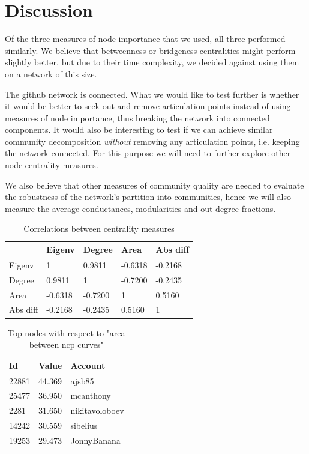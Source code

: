 \documentclass[9pt,twocolumn,twoside]{pnas-new}
\begin{document}
\pagebreak
\section*{Discussion}
Of the three measures of node importance that we used, all three performed similarly. 
We believe that betweenness or bridgeness centralities might perform slightly better, but due to their time complexity, we decided against using them on a network of this size.

The github network is connected. 
What we would like to test further is whether it would be better to seek out and remove articulation points instead of using measures of node importance, thus breaking the network into connected components.
It would also be interesting to test if we can achieve similar community decomposition \emph{without} removing any articulation points,
i.e. keeping the network connected. For this purpose we will need to further explore other node centrality measures.

We also believe that other measures of community quality are needed to evaluate the robustness of the network's partition into communities, hence we will also measure the average conductances, modularities and out-degree fractions.

\begin{table}
    \centering
    \begin{tabular}{|l|l|l|l|l|}
        \hline
        & Eigenv & Degree & Area & Abs diff \\ \hline
        Eigenv & 1 & 0.9811 & -0.6318 & -0.2168 \\ \hline
        Degree & 0.9811 & 1 & -0.7200 & -0.2435 \\ \hline
        Area & -0.6318 & -0.7200 & 1 & 0.5160 \\ \hline
        Abs diff & -0.2168 & -0.2435 & 0.5160 & 1 \\ \hline
    \end{tabular}
    \caption{Correlations between centrality measures}
    \label{tab:cor}
\end{table}

\begin{table}
    \centering
    \begin{tabular}{|l|l|l|}
        \hline
        Id & Value & Account \\ \hline
        22881 & 44.369 & ajsb85 \\ \hline
        25477 & 36.950 & mcanthony \\ \hline
        2281 & 31.650 & nikitavoloboev \\ \hline
        14242 & 30.559 & sibelius \\ \hline
        19253 & 29.473 & JonnyBanana \\ \hline
    \end{tabular}
    \caption{Top nodes with respect to "area between ncp curves"}
    \label{tab:area_top}
\end{table}
\end{document}
